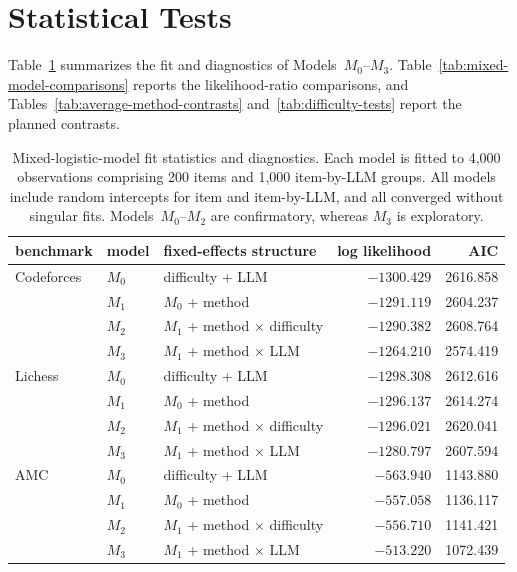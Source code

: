 \section{Statistical Tests}

Table~\ref{tab:mixed-model-fits} summarizes the fit and diagnostics of Models~$M_0$--$M_3$.
Table~\ref{tab:mixed-model-comparisons} reports the likelihood-ratio comparisons, and Tables~\ref{tab:average-method-contrasts} and~\ref{tab:difficulty-tests} report the planned contrasts.

\begin{table}[H]
\centering
\footnotesize
\setlength{\tabcolsep}{3pt}
\caption{Mixed-logistic-model fit statistics and diagnostics.
Each model is fitted to 4{,}000 observations comprising 200 items and 1{,}000 item-by-LLM groups.
All models include random intercepts for item and item-by-LLM, and all converged without singular fits.
Models~$M_0$--$M_2$ are confirmatory, whereas $M_3$ is exploratory.}
\label{tab:mixed-model-fits}
\begin{tabular}{@{}lllrr@{}}
\toprule
benchmark & model & fixed-effects structure & log likelihood & AIC \\
\midrule
Codeforces & $M_0$ & difficulty + LLM & $-1300.429$ & 2616.858 \\
 & $M_1$ & $M_0$ + method & $-1291.119$ & 2604.237 \\
 & $M_2$ & $M_1$ + method $\times$ difficulty & $-1290.382$ & 2608.764 \\
 & $M_3$ & $M_1$ + method $\times$ LLM & $-1264.210$ & 2574.419 \\
\midrule
Lichess & $M_0$ & difficulty + LLM & $-1298.308$ & 2612.616 \\
 & $M_1$ & $M_0$ + method & $-1296.137$ & 2614.274 \\
 & $M_2$ & $M_1$ + method $\times$ difficulty & $-1296.021$ & 2620.041 \\
 & $M_3$ & $M_1$ + method $\times$ LLM & $-1280.797$ & 2607.594 \\
\midrule
AMC & $M_0$ & difficulty + LLM & $-563.940$ & 1143.880 \\
 & $M_1$ & $M_0$ + method & $-557.058$ & 1136.117 \\
 & $M_2$ & $M_1$ + method $\times$ difficulty & $-556.710$ & 1141.421 \\
 & $M_3$ & $M_1$ + method $\times$ LLM & $-513.220$ & 1072.439 \\
\bottomrule
\end{tabular}
\end{table}

